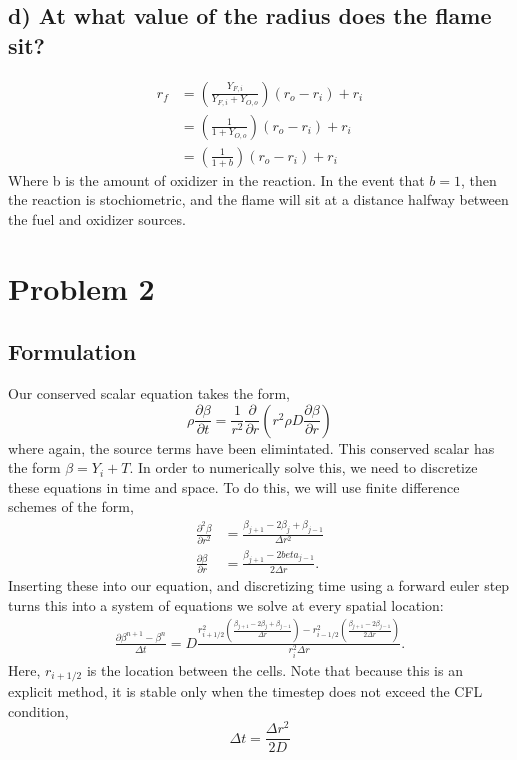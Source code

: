 \documentclass{article}
\begin{document}
\subsection*{d) At what value of the radius does the flame sit?}

\begin{eqnarray*}
 r_f &= \left(\frac{Y_{F,i}}{Y_{F,i} + Y_{O,o}} \right)(r_o - r_i) + r_i \\
     &= \left(\frac{1}{1 + Y_{O,o}} \right)(r_o - r_i) + r_i \\
     &= \left(\frac{1}{1 + b} \right)(r_o - r_i) + r_i 
\end{eqnarray*}
Where b is the amount of oxidizer in the reaction. In the event that
$b=1$, then the reaction is stochiometric, and the flame will sit at a
distance halfway between the fuel and oxidizer sources. 

\newpage
\section*{Problem 2}
\subsection*{Formulation}
Our conserved scalar equation takes the form,
\begin{equation*}
 \rho \frac{\partial \beta}{\partial t} = \frac{1}{r^2}\frac{\partial
  }{\partial r}\left( r^2 \rho D \frac{\partial \beta}{\partial r}
	       \right) 
\end{equation*}
where again, the source terms have been elimintated. This conserved
scalar has the form $\beta = Y_i + T$. In order to numerically solve
this, we need to discretize these equations in time and space. To do
this, we will use finite difference schemes of the form,
\begin{eqnarray*}
 \frac{\partial^2 \beta}{\partial r^2} &= \frac{\beta_{j+1}-2 \beta_j +
  \beta_{j-1}}{\Delta r^2}\\
 \frac{\partial \beta}{\partial r} &= \frac{\beta_{j+1}-2
 beta_{j-1}}{2\Delta r}.
\end{eqnarray*}
Inserting these into our equation, and discretizing time using a forward
euler step turns this into a system of equations we solve at every
spatial location:
\begin{eqnarray*}
\frac{\partial \beta^{n+1} - \beta^{n}}{\Delta t} = D \frac{r^2_{i+1/2}
 \left(\frac{\beta_{j+1}-2 \beta_j + \beta_{j-1}}{\Delta r}\right) -
 r^2_{i-1/2}\left(\frac{\beta_{j+1}-2 \beta_{j-1}}{2\Delta r}\right)}{r^2_i\Delta r}.
\end{eqnarray*}
Here, $r_{i+1/2}$ is the location between the cells. Note that because
this is an explicit method, it is stable only when the timestep does not
exceed the CFL condition, 
\begin{equation*}
 \Delta t = \frac{\Delta r^2}{2 D}
\end{equation*}
\end{document}
